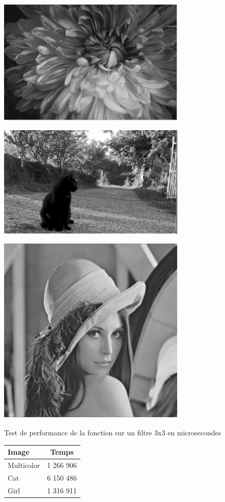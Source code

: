 \documentclass{article}
\begin{document}
\begin{center} 
    \includegraphics[width=9cm]{../Image_fonctions/Multicolor/Average3.PNG}
\end{center}
\begin{center} 
    \includegraphics[width=9cm]{../Image_fonctions/Cat/Average3.PNG}
\end{center}
\begin{center} 
    \includegraphics[width=9cm]{../Image_fonctions/Lenna/Average3.PNG}
\end{center}

\begin{center}
\medbreak
Test de performance de la fonction sur un filtre 3x3 en microsecondes
\bigbreak
   \begin{tabular}{ | l | c | }
     \hline
     Image & Temps \\
     \hline
     Multicolor & 1 266 906 \\
     \hline
     Cat & 6 150 486 \\
     \hline
     Girl & 1 316 911 \\
     \hline
   \end{tabular}
 \end{center}
\bigbreak
\end{document}
